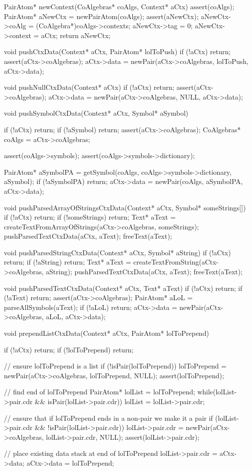 PairAtom* newContext(CoAlgebras* coAlgs, Context* aCtx) {
  assert(coAlgs);
  PairAtom* aNewCtx = newPairAtom(coAlgs);
  assert(aNewCtx);
  aNewCtx->coAlg    = (CoAlgebra*)coAlgs->contexts;
  aNewCtx->tag      = 0;
  aNewCtx->context  = aCtx;
  return aNewCtx;
}

void pushCtxData(Context* aCtx, PairAtom* lolToPush) {
  if (!aCtx) return;
  assert(aCtx->coAlgebras);
  aCtx->data = newPair(aCtx->coAlgebras, lolToPush, aCtx->data);
}

void pushNullCtxData(Context* aCtx) {
  if (!aCtx) return;
  assert(aCtx->coAlgebras);
  aCtx->data = newPair(aCtx->coAlgebras, NULL, aCtx->data);
}

void pushSymbolCtxData(Context* aCtx, Symbol* aSymbol) {
  if (!aCtx) return;
  if (!aSymbol) return;
  assert(aCtx->coAlgebras);
  CoAlgebras* coAlgs = aCtx->coAlgebras;

  assert(coAlgs->symbols);
  assert(coAlgs->symbols->dictionary);

  PairAtom* aSymbolPA =
    getSymbol(coAlgs, coAlgs->symbols->dictionary, aSymbol);
  if (!aSymbolPA) return;
  aCtx->data = newPair(coAlgs, aSymbolPA, aCtx->data);
}

void pushParsedArrayOfStringsCtxData(Context* aCtx, Symbol* someStrings[]) {
  if (!aCtx) return;
  if (!someStrings) return;
  Text* aText = createTextFromArrayOfStrings(aCtx->coAlgebras, someStrings);
  pushParsedTextCtxData(aCtx, aText);
  freeText(aText);
}

void pushParsedStringCtxData(Context* aCtx, Symbol* aString) {
  if (!aCtx) return;
  if (!aString) return;
  Text* aText = createTextFromString(aCtx->coAlgebras, aString);
  pushParsedTextCtxData(aCtx, aText);
  freeText(aText);
}

void pushParsedTextCtxData(Context* aCtx, Text* aText) {
  if (!aCtx) return;
  if (!aText) return;
  assert(aCtx->coAlgebras);
  PairAtom* aLoL = parseAllSymbols(aText);
  if (!aLoL) return;
  aCtx->data = newPair(aCtx->coAlgebras, aLoL, aCtx->data);
}

void prependListCtxData(Context* aCtx, PairAtom* lolToPrepend) {
  if (!aCtx) return;
  if (!lolToPrepend) return;

  // ensure lolToPrepend is a list
  if (!isPair(lolToPrepend)) {
    lolToPrepend = newPair(aCtx->coAlgebras, lolToPrepend, NULL);
    assert(lolToPrepend);
  }

  // find end of lolToPrepend
  PairAtom* lolList = lolToPrepend;
  while(lolList->pair.cdr && isPair(lolList->pair.cdr)) {
    lolList = lolList->pair.cdr;
  }

  // ensure that if lolToPrepend ends in a non-pair we make it a pair
  if (lolList->pair.cdr && !isPair(lolList->pair.cdr)) {
    lolList->pair.cdr = newPair(aCtx->coAlgebras, lolList->pair.cdr, NULL);
    assert(lolList->pair.cdr);
  }

  // place existing data stack at end of lolToPrepend
  lolList->pair.cdr = aCtx->data;
  aCtx->data   = lolToPrepend;
}

